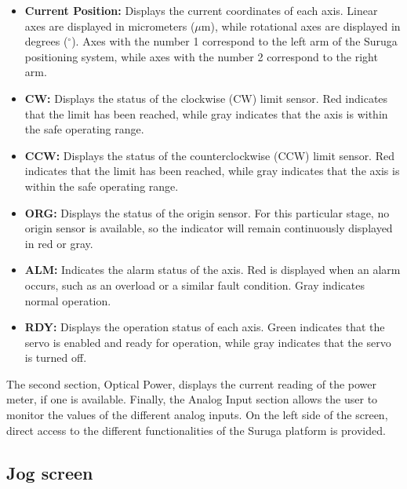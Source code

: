 \documentclass[../../main.tex]{subfiles}
\begin{document}
\begin{itemize}
    \item \textbf{Current Position:} Displays the current coordinates of each axis. Linear axes are displayed in micrometers ($\mu$m), while rotational axes are displayed in degrees ($^\circ$). Axes with the number 1 correspond to the left arm of the Suruga positioning system, while axes with the number 2 correspond to the right arm.

    \item \textbf{CW:} Displays the status of the clockwise (CW) limit sensor. Red indicates that the limit has been reached, while gray indicates that the axis is within the safe operating range.

    \item \textbf{CCW:} Displays the status of the counterclockwise (CCW) limit sensor. Red indicates that the limit has been reached, while gray indicates that the axis is within the safe operating range.

    \item \textbf{ORG:} Displays the status of the origin sensor. For this particular stage, no origin sensor is available, so the indicator will remain continuously displayed in red or gray.

    \item \textbf{ALM:} Indicates the alarm status of the axis. Red is displayed when an alarm occurs, such as an overload or a similar fault condition. Gray indicates normal operation.

    \item \textbf{RDY:} Displays the operation status of each axis. Green indicates that the servo is enabled and ready for operation, while gray indicates that the servo is turned off.
\end{itemize}

The second section, Optical Power, displays the current reading of the power meter, if one is available. Finally, the Analog Input section allows the user to monitor the values of the different analog inputs. On the left side of the screen, direct access to the different functionalities of the Suruga platform is provided.


\subsection{Jog screen}
\end{document}
